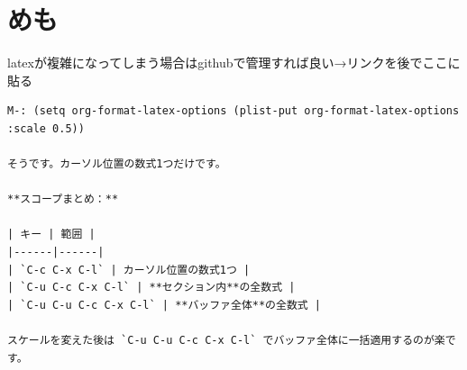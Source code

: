 \section{めも}
latexが複雑になってしまう場合はgithubで管理すれば良い→リンクを後でここに貼る

\begin{verbatim}
M-: (setq org-format-latex-options (plist-put org-format-latex-options :scale 0.5))

そうです。カーソル位置の数式1つだけです。

**スコープまとめ：**

| キー | 範囲 |
|------|------|
| `C-c C-x C-l` | カーソル位置の数式1つ |
| `C-u C-c C-x C-l` | **セクション内**の全数式 |
| `C-u C-u C-c C-x C-l` | **バッファ全体**の全数式 |

スケールを変えた後は `C-u C-u C-c C-x C-l` でバッファ全体に一括適用するのが楽です。

\end{verbatim}
